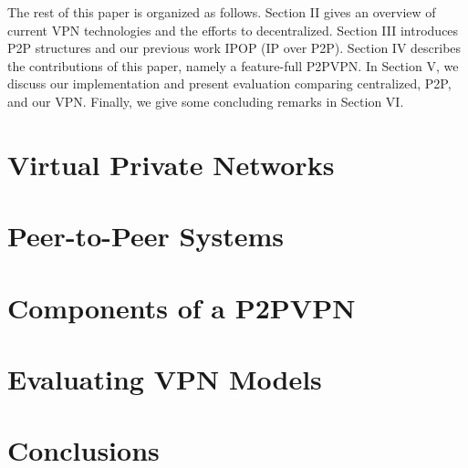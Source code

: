 \documentclass{sig-alternate}
\begin{document}
The rest of this paper is organized as follows.  Section II gives an overview
of current VPN technologies and the efforts to decentralized.  Section III
introduces P2P structures and our previous work IPOP (IP over P2P).  Section IV
describes the contributions of this paper, namely a feature-full P2PVPN.  In
Section V, we discuss our implementation and present evaluation comparing
centralized, P2P, and our VPN.  Finally, we give some concluding remarks in
Section VI.

\section{Virtual Private Networks}
\section{Peer-to-Peer Systems}
\section{Components of a P2PVPN}
\section{Evaluating VPN Models}
\section{Conclusions}



\suppressfloats
\end{document}
